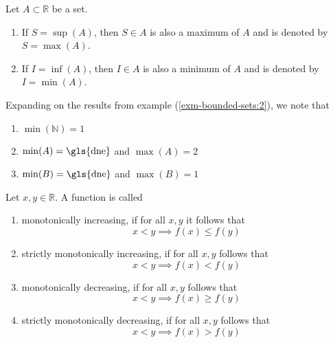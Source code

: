 \begin{definition}\label{def-maximum-minimum}
	Let $A\subset\mathbb{R}$ be a set.
	\begin{enumerate}
		\item If $S=\sup(A)$, then $S\in A$ is also a maximum of $A$ and is denoted by $S=\max(A)$.
		\item If $I=\inf(A)$, then $I\in A$ is also a minimum of $A$ and is denoted by $I=\min(A)$.
	\end{enumerate}
\end{definition}

\begin{exm}\label{exm-bounded-sets:3}
	Expanding on the results from example (\ref{exm-bounded-sets:2}), we note that
	\begin{enumerate}
		\item $\min(\mathbb{N})=1$
		\item $\min(A)=\text{\gls{dne}}$ and $\max(A)=2$
		\item $\min(B)=\text{\gls{dne}}$ and $\max(B)=1$
	\end{enumerate}
\end{exm}

\begin{definition}\label{def-monotonicity}
	Let $x,y\in\mathbb{R}$. A function is called
	\begin{enumerate}
		\item monotonically increasing, if for all $x,y$ it follows that
		      \begin{equation}\label{eq-monotonically-increasing}
			      x<y \implies f(x)\leq f(y)
		      \end{equation}
		\item strictly monotonically increasing, if for all $x,y$ follows that
		      \begin{equation}\label{eq-strictly-monotonically-increasing}
			      x<y \implies f(x)<f(y)
		      \end{equation}
		\item monotonically decreasing, if for all $x,y$ follows that
		      \begin{equation}\label{eq-monotonically-decreasing}
			      x<y \implies f(x)\geq f(y)
		      \end{equation}
		\item strictly monotonically decreasing, if for all $x,y$ follows that
		      \begin{equation}\label{eq-strictly-monotonically-decreasing}
			      x<y \implies f(x)>f(y)
		      \end{equation}
	\end{enumerate}
\end{definition}

